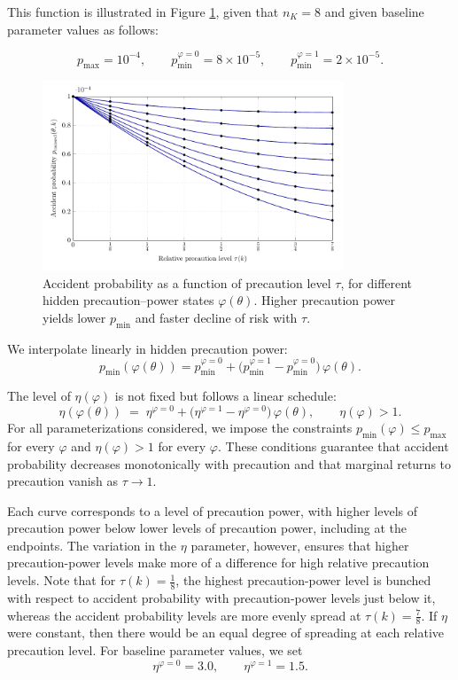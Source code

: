\documentclass{article}
\begin{document}
This function is illustrated in Figure \ref{fig:precaution.pdf}, given that $n_K = 8$ and given baseline parameter values as follows:

\[
p_{\max}=10^{-4}, \qquad 
p_{\min}^{\varphi=0}=8\times 10^{-5}, \qquad 
p_{\min}^{\varphi=1}=2\times 10^{-5}.
\]

\begin{figure}[t]
  \centering
  \includegraphics[width=0.8\textwidth]{../Figures/precaution.pdf}
  \caption{Accident probability as a function of precaution level $\tau$, for different hidden precaution–power states $\varphi(\theta)$. Higher precaution power yields lower $p_{\min}$ and faster decline of risk with $\tau$.}
  \label{fig:precaution.pdf}
\end{figure}

We interpolate linearly in hidden precaution power:
\[
p_{\min}(\varphi(\theta)) = p_{\min}^{\varphi=0} +
\bigl(p_{\min}^{\varphi=1}-p_{\min}^{\varphi=0}\bigr)\,\varphi(\theta).
\]

The level of $\eta(\varphi)$ is not fixed but follows a linear schedule:
\[
\eta(\varphi(\theta)) \;=\; \eta^{\varphi=0} + 
\bigl(\eta^{\varphi=1}-\eta^{\varphi=0}\bigr)\,\varphi(\theta),
\qquad \eta(\varphi) > 1.
\]
For all parameterizations considered, we impose the constraints $p_{\min}(\varphi) \leq p_{\max}$ for every $\varphi$ and $\eta(\varphi) > 1$ for every $\varphi$. These conditions guarantee that accident probability decreases monotonically with precaution and that marginal returns to precaution vanish as $\tau \to 1$.

Each curve corresponds to a level of precaution power, with higher levels of precaution power below lower levels of precaution power, including at the endpoints. The variation in the $\eta$ parameter, however, ensures that higher precaution-power levels make more of a difference for high relative precaution levels. Note that for $\tau(k) = \tfrac{1}{8}$, the highest precaution-power level is bunched with respect to accident probability with precaution-power levels just below it, whereas the accident probability levels are more evenly spread at $\tau(k) = \tfrac{7}{8}$. If $\eta$ were constant, then there would be an equal degree of spreading at each relative precaution level. For baseline parameter values, we set
\[
\eta^{\varphi=0}=3.0, \qquad \eta^{\varphi=1}=1.5.
\]
\end{document}
